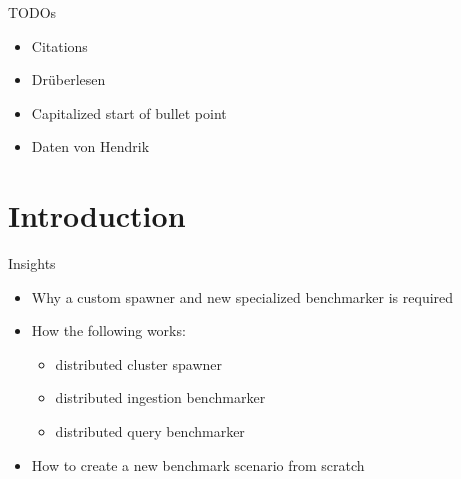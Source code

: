 \documentclass[compress,aspectratio=169]{beamer}
\begin{document}
  \begin{frame}{TODOs}
    \begin{itemize}
      \item Citations
      \item Dr\"uberlesen
      \item Capitalized start of bullet point
      \item Daten von Hendrik
    \end{itemize}
  \end{frame}

	\begin{frame}[plain]
		\titlepage
	\end{frame}

	\begin{frame}[t]{}
		\tableofcontents[subsectionstyle=hide/hide]
	\end{frame}


	\section{Introduction}
	\begin{frame}{Insights}
		\begin{itemize}
			\item Why a custom spawner and new specialized benchmarker is required
      \item How the following works:
        \begin{itemize}
          \item distributed cluster spawner
          \item distributed ingestion benchmarker
          \item distributed query benchmarker
        \end{itemize}
      \item How to create a new benchmark scenario from scratch
		\end{itemize}
	\end{frame}
\end{document}
